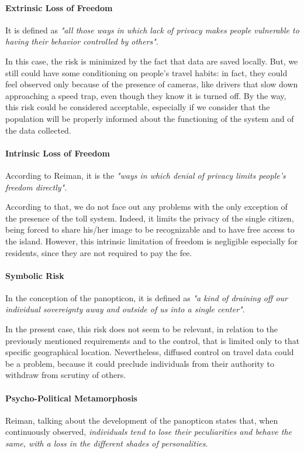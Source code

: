 \paragraph{Extrinsic Loss of Freedom}
It is defined as \textit{"all those ways in which lack of privacy makes people vulnerable to having their behavior controlled by others"}.

In this case, the risk is minimized by the fact that data are saved locally. But, we still could have some conditioning on people's travel habits: in fact, they could feel observed only because of the presence of cameras, like drivers that slow down approaching a speed trap, even though they know it is turned off. By the way, this risk could be considered acceptable, especially if we consider that the population will be properly informed about the functioning of the system and of the data collected.
\newpage
\paragraph{Intrinsic Loss of Freedom}
According to Reiman, it is the \textit{"ways in which denial of privacy limits people's freedom directly"}.

According to that, we do not face out any problems with the only exception of the presence of the toll system. Indeed, it limits the privacy of the single citizen, being forced to share his/her image to be recognizable and to have free access to the island. However, this intrinsic limitation of freedom is negligible especially for residents, since they are not required to pay the fee.

\paragraph{Symbolic Risk}
In the conception of the panopticon, it is defined as \textit{"a kind of draining off our individual sovereignty away and outside of us into a single center"}.

In the present case, this risk does not seem to be relevant, in relation to the previously mentioned requirements and to the control, that is limited only to that specific geographical location. Nevertheless, diffused control on travel data could be a problem, because it could preclude individuals from their authority to withdraw from scrutiny of others.

\paragraph{Psycho-Political Metamorphosis}
Reiman, talking about the development of the panopticon states that, when continuously observed, \textit{individuals tend to lose their peculiarities and behave the same, with a loss in the different shades of personalities}.

